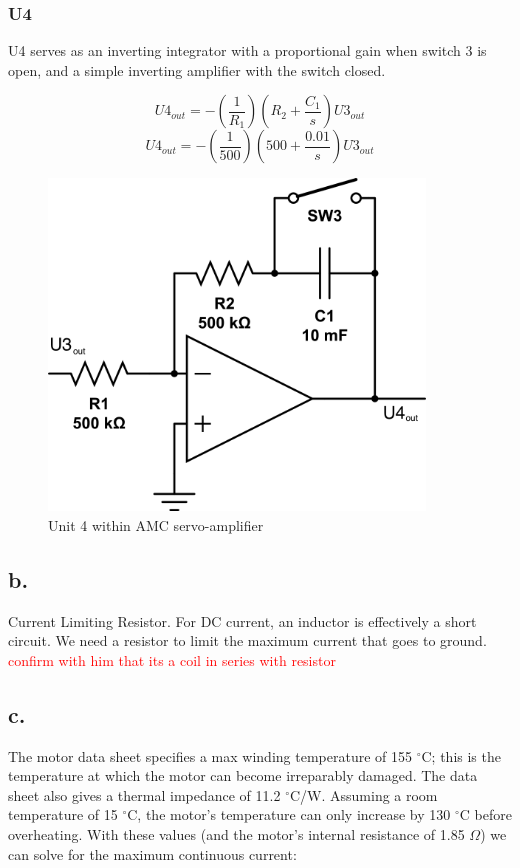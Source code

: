 \documentclass{article}
\newcommand{\xxx}[1]{\textcolor{red}{#1}}
\theoremstyle{plain}
\theoremstyle{definition}
\theoremstyle{remark}
\begin{document}
\subsubsection*{U4}

U4 serves as an inverting integrator with a proportional gain when switch 3 is open, and a simple inverting amplifier with the switch closed.

$$U4_{out} = - \left( \frac{1}{R_1} \right) \left( R_2 + \frac{C_1}{s} \right) U3_{out} $$
$$U4_{out} = - \left( \frac{1}{500} \right) \left( 500 + \frac{0.01}{s} \right) U3_{out} $$

\begin{figure}[htb]
\begin{center}
\includegraphics[width = 10cm]{q1a_u4.png}
\caption{Unit 4 within AMC servo-amplifier}
\label{q1_au4}
\end{center}
\end{figure}

\subsection*{b.}
Current Limiting Resistor.
For DC current, an inductor is effectively a short circuit.  We need a resistor to limit the maximum current that goes to ground.
\xxx{confirm with him that its a coil in series with resistor}

\subsection*{c.}
The motor data sheet specifies a max winding temperature of 155 $^\circ$C; this is the temperature at which the motor can become irreparably damaged. The data sheet also gives a thermal impedance of 11.2 $^\circ$C/W. Assuming a room temperature of 15 $^\circ$C, the motor's temperature can only increase by 130 $^\circ$C before overheating. With these values (and the motor's internal resistance of 1.85 $\Omega$) we can solve for the maximum continuous current:
\end{document}
